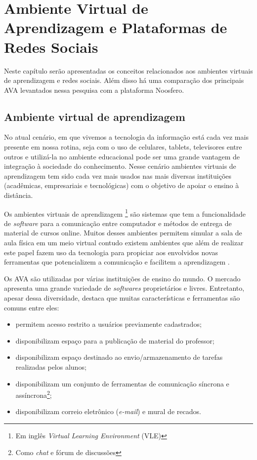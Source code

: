 \chapter{Ambiente Virtual de Aprendizagem e Plataformas de Redes Sociais}
\label{avas-redes-sociais}

Neste capítulo serão apresentadas os conceitos relacionados aos ambientes virtuais de aprendizagem e redes sociais. Além disso há uma comparação dos principais AVA levantados nessa pesquisa com a plataforma Noosfero.

\section{Ambiente virtual de aprendizagem}
\label{ava}

No atual cenário, em que vivemos a tecnologia da informação está cada vez mais presente em nossa rotina, seja com o uso de celulares, tablets, televisores entre outros e utilizá-la no ambiente educacional pode ser uma grande vantagem de integração à sociedade do conhecimento. Nesse cenário ambientes virtuais de aprendizagem tem sido cada vez mais usados nas mais diversas instituições (acadêmicas, empresariais e tecnológicas) com o objetivo de apoiar o ensino à distância.

Os ambientes virtuais de aprendizagem \footnote{Em inglês \textit{Virtual Learning Environment} (VLE)} são sistemas que tem a funcionalidade de \textit{software} para a comunicação entre computador e métodos de entrega de material de cursos online. Muitos desses ambientes permitem simular a sala de aula física em um meio virtual contudo existem ambientes que além de realizar este papel fazem uso da tecnologia para propiciar aos envolvidos novas ferramentas que potencializem a comunicação e facilitem a aprendizagem \cite{schlemmer2005ambiente}.


Os AVA são utilizadas por várias instituições de ensino do mundo. O mercado apresenta uma grande variedade de \textit{softwares} proprietários e livres. Entretanto, apesar dessa diversidade,  destaca que muitas características e ferramentas são comuns entre eles:
\begin{itemize}
\item permitem acesso restrito a usuários previamente cadastrados;
\item disponibilizam espaço para a publicação de material do professor;
\item disponibilizam espaço destinado ao envio/armazenamento de tarefas realizadas pelos alunos;
\item disponibilizam um conjunto de ferramentas de comunicação síncrona e assíncrona\footnote{Como \textit{chat} e fórum de discussões};
\item disponibilizam correio eletrônico (\textit{e-mail}) e mural de recados.
\end{itemize}

